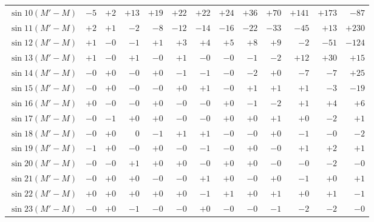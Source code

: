 \begin{landscape}
\begin{longtable}{@{}l|r|r|r|r|r|r|r|r|r|r|r|r@{}}
\(\sin 10(M'-M)\) & \(-5\) & \(+2\) & \(+13\) & \(+19\) & \(+22\) & \(+22\) & \(+24\) & \(+36\) & \(+70\) & \(+141\) & \(+173\) & \(-87\)\\
\(\sin 11(M'-M)\) & \(+2\) & \(+1\) & \(-2\) & \(-8\) & \(-12\) & \(-14\) & \(-16\) & \(-22\) & \(-33\) & \(-45\) & \(+13\) & \(+230\)\\
\(\sin 12(M'-M)\) & \(+1\) & \(-0\) & \(-1\) & \(+1\) & \(+3\) & \(+4\) & \(+5\) & \(+8\) & \(+9\) & \(-2\) & \(-51\) & \(-124\)\\
\(\sin 13(M'-M)\) & \(+1\) & \(-0\) & \(+1\) & \(-0\) & \(+1\) & \(-0\) & \(-0\) & \(-1\) & \(-2\) & \(+12\) & \(+30\) & \(+15\)\\
\(\sin 14(M'-M)\) & \(-0\) & \(+0\) & \(-0\) & \(+0\) & \(-1\) & \(-1\) & \(-0\) & \(-2\) & \(+0\) & \(-7\) & \(-7\) & \(+25\)\\
\(\sin 15(M'-M)\) & \(-0\) & \(+0\) & \(-0\) & \(-0\) & \(+0\) & \(+1\) & \(-0\) & \(+1\) & \(+1\) & \(+1\) & \(-3\) & \(-19\)\\
\(\sin 16(M'-M)\) & \(+0\) & \(-0\) & \(-0\) & \(+0\) & \(-0\) & \(-0\) & \(+0\) & \(-1\) & \(-2\) & \(+1\) & \(+4\) & \(+6\)\\
\(\sin 17(M'-M)\) & \(-0\) & \(-1\) & \(+0\) & \(+0\) & \(-0\) & \(-0\) & \(+0\) & \(+0\) & \(+1\) & \(+0\) & \(-2\) & \(+1\)\\
\(\sin 18(M'-M)\) & \(-0\) & \(+0\) & \(0\) & \(-1\) & \(+1\) & \(+1\) & \(-0\) & \(-0\) & \(+0\) & \(-1\) & \(-0\) & \(-2\)\\
\(\sin 19(M'-M)\) & \(-1\) & \(+0\) & \(-0\) & \(+0\) & \(-0\) & \(-1\) & \(-0\) & \(+0\) & \(-0\) & \(+1\) & \(+2\) & \(+1\)\\
\(\sin 20(M'-M)\) & \(-0\) & \(-0\) & \(+1\) & \(+0\) & \(+0\) & \(-0\) & \(+0\) & \(+0\) & \(-0\) & \(-0\) & \(-2\) & \(-0\)\\
\(\sin 21(M'-M)\) & \(-0\) & \(+0\) & \(+0\) & \(-0\) & \(-0\) & \(+1\) & \(+0\) & \(-0\) & \(+0\) & \(-1\) & \(+0\) & \(+1\)\\
\(\sin 22(M'-M)\) & \(+0\) & \(+0\) & \(+0\) & \(+0\) & \(+0\) & \(-1\) & \(+1\) & \(+0\) & \(+1\) & \(+0\) & \(+1\) & \(-1\)\\
\(\sin 23(M'-M)\) & \(-0\) & \(+0\) & \(-1\) & \(-0\) & \(-0\) & \(+0\) & \(-0\) & \(-0\) & \(-1\) & \(-2\) & \(-2\) & \(-0\)\\
\end{longtable}
\clearpage
\endgroup
\clearpage
\begingroup
\fontsize{8.5}{10.5}\selectfont
{}
\renewcommand{\headrulewidth}{0pt}

\end{landscape}

